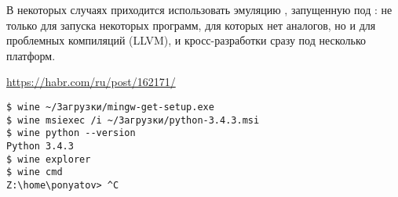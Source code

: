 
В некоторых случаях приходится использовать эмуляцию \win, запущенную под \linux:
не только для запуска некоторых программ, для которых нет аналогов, но и для проблемных компиляций (LLVM),
и кросс-разработки сразу под несколько платформ.

\bigskip \url{https://habr.com/ru/post/162171/}

\begin{verbatim}
$ wine ~/Загрузки/mingw-get-setup.exe
$ wine msiexec /i ~/Загрузки/python-3.4.3.msi
$ wine python --version
Python 3.4.3
$ wine explorer
$ wine cmd
Z:\home\ponyatov> ^C
\end{verbatim}
